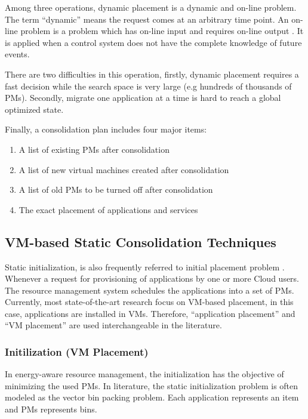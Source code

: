 \begin{enumerate}
	Among three operations, dynamic placement is a dynamic and on-line problem.
	The term ``dynamic'' means the request comes at an arbitrary time point. An on-line problem is a problem which has on-line input and requires on-line output \cite{Borodin:uQcy_H6C}. It is applied when a control system does not have the complete knowledge of future events.

	There are two difficulties in this operation, firstly, dynamic placement requires a fast decision while the search space is very large (e.g hundreds of thousands of PMs). Secondly, migrate one application at a time is hard to reach a global optimized state.

\end{enumerate}

Finally, a consolidation plan includes four major items:
			\begin{enumerate}
				\item A list of existing PMs after consolidation
				\item A list of new virtual machines created after consolidation
				\item A list of old PMs to be turned off after consolidation
				\item The exact placement of applications and services
			\end{enumerate}


\subsection{VM-based Static Consolidation Techniques}
\label{sec:static}

Static initialization, is also frequently referred to initial placement problem \cite{Jennings:2015ht}. Whenever a request for provisioning of applications by one or more Cloud users. The resource management system schedules the applications into a set of PMs. Currently, most state-of-the-art research focus on VM-based placement, in this case, applications are installed in VMs. Therefore, ``application placement'' and ``VM placement'' are used interchangeable in the literature. 


\subsubsection{Initilization (VM Placement)}
In energy-aware resource management, the initialization has the objective of minimizing the used PMs. In literature, the static initialization problem is often modeled as the vector bin packing problem. Each application represents an item and PMs represents bins.

